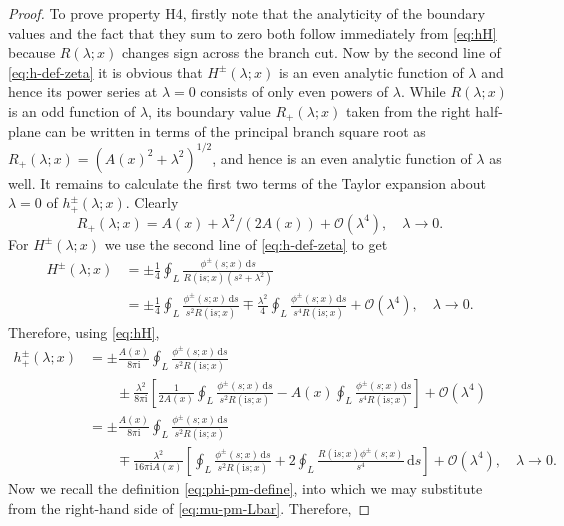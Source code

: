 \documentclass[12pt]{amsart}
\numberwithin{equation}{section}
\newcommand{\dd}{\mathrm{d}}
\newcommand{\ii}{\mathrm{i}}
\newcommand{\SP}{\lambda}
\newcommand{\bigo}[1]{ \mathcal{O}\! \left( #1 \right) }
\begin{document}
\begin{proof}
To prove property H4, firstly note that the analyticity of the boundary values and the fact that they sum to zero both follow immediately from \eqref{eq:hH} because $R(\SP;x)$ changes sign across the branch cut.  Now by the second line of \eqref{eq:h-def-zeta} it is obvious that $H^\pm(\SP;x)$ is an even analytic function of $\SP$ and hence its power series at $\SP=0$ consists of only even powers of $\SP$.  While $R(\SP;x)$ is an odd function of $\SP$, its boundary value $R_+(\SP;x)$ taken from the right half-plane can be written in terms of the principal branch square root as $R_+(\SP;x)=(A(x)^2+\SP^2)^{1/2}$, and hence is an even analytic function of $\SP$ as well.    It remains to calculate the first two terms of the Taylor expansion about $\SP=0$ of $h^\pm_+(\SP;x)$.  Clearly 
\begin{equation}
R_+(\SP;x)=A(x) +\SP^2/(2A(x)) + \bigo{\SP^4},\quad \SP\to 0.
\label{eq:R-plus-expand}
\end{equation}
For $H^\pm(\SP;x)$ we use the second line of \eqref{eq:h-def-zeta} to get 
\begin{equation}
\begin{split}
H^\pm(\SP;x)&=\pm\frac{1}{4}\oint_L\frac{\phi^\pm(s;x)\,\dd s}{R(\ii s;x)(s^2+\SP^2)} \\ &= 
\pm\frac{1}{4}\oint_L\frac{\phi^\pm(s;x)\,\dd s}{s^2R(\ii s;x)} \mp \frac{\SP^2}{4}\oint_L\frac{\phi^\pm(s;x)\,\dd s}{s^4R(\ii s;x)} +\bigo{\SP^4},\quad \SP\to 0.
\end{split}
\end{equation}
Therefore, using \eqref{eq:hH}, 
\begin{equation}
\begin{split}
h_+^\pm(\SP;x)&=\pm\frac{A(x)}{8\pi \ii}\oint_L\frac{\phi^\pm(s;x)\,\dd s}{s^2R(\ii s;x)} \\&\quad\quad{}\pm\frac{\SP^2}{8\pi \ii}\left[\frac{1}{2A(x)}\oint_L\frac{\phi^\pm(s;x)\,\dd s}{s^2R(\ii s;x)} - A(x)\oint_L\frac{\phi^\pm(s;x)\,\dd s}{s^4R(\ii s;x)}\right] + \bigo{\SP^4}\\
&=\pm\frac{A(x)}{8\pi \ii}\oint_L\frac{\phi^\pm(s;x)\,\dd s}{s^2R(\ii s;x)} \\&\quad\quad{}\mp\frac{\SP^2}{16\pi \ii A(x)}\left[
\oint_L\frac{\phi^\pm(s;x)\,\dd s}{s^2R(\ii s;x)} + 2\oint_L\frac{R(\ii s;x)\phi^\pm(s;x)}{s^4}\,\dd s\right] + \bigo{\SP^4},\quad\SP\to 0.
\end{split}
\end{equation}
Now we recall the definition \eqref{eq:phi-pm-define}, into which we may substitute from the right-hand side of \eqref{eq:mu-pm-Lbar}.  Therefore,

\end{proof}
\end{document}
